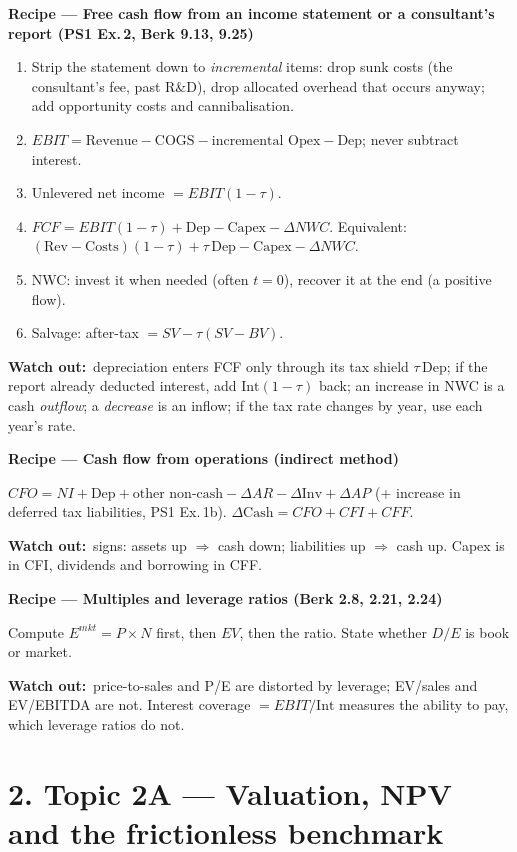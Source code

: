 \documentclass[10pt,a4paper]{article}
\newcommand{\recipe}[1]{\par\smallskip\noindent\textbf{\color{hd}Recipe --- #1}\par}
\newcommand{\watch}{\par\noindent\textbf{\color{wr}Watch out:}~}
\begin{document}
\recipe{Free cash flow from an income statement or a consultant's report (PS1 Ex.\,2, Berk 9.13, 9.25)}
\begin{enumerate}
  \item Strip the statement down to \emph{incremental} items: drop sunk costs (the consultant's fee,
        past R\&D), drop allocated overhead that occurs anyway; add opportunity costs and
        cannibalisation.
  \item $EBIT=\text{Revenue}-\text{COGS}-\text{incremental Opex}-\text{Dep}$; never subtract interest.
  \item Unlevered net income $=EBIT(1-\tau)$.
  \item $FCF=EBIT(1-\tau)+\text{Dep}-\text{Capex}-\Delta NWC$. Equivalent:
        $(\text{Rev}-\text{Costs})(1-\tau)+\tau\,\text{Dep}-\text{Capex}-\Delta NWC$.
  \item NWC: invest it when needed (often $t=0$), recover it at the end (a positive flow).
  \item Salvage: after-tax $=SV-\tau(SV-BV)$.
\end{enumerate}
\watch depreciation enters FCF only through its tax shield $\tau\,\text{Dep}$; if the report already
deducted interest, add $\text{Int}(1-\tau)$ back; an increase in NWC is a cash \emph{outflow}; a
\emph{decrease} is an inflow; if the tax rate changes by year, use each year's rate.

\recipe{Cash flow from operations (indirect method)}
$CFO=NI+\text{Dep}+\text{other non-cash}-\Delta AR-\Delta\text{Inv}+\Delta AP$ (+ increase in deferred
tax liabilities, PS1 Ex.\,1b). $\Delta\text{Cash}=CFO+CFI+CFF$.
\watch signs: assets up $\Rightarrow$ cash down; liabilities up $\Rightarrow$ cash up. Capex is in CFI,
dividends and borrowing in CFF.

\recipe{Multiples and leverage ratios (Berk 2.8, 2.21, 2.24)}
Compute $E^{mkt}=P\times N$ first, then $EV$, then the ratio. State whether $D/E$ is book or market.
\watch price-to-sales and P/E are distorted by leverage; EV/sales and EV/EBITDA are not. Interest
coverage $=EBIT/\text{Int}$ measures the ability to pay, which leverage ratios do not.

\section*{2. Topic 2A --- Valuation, NPV and the frictionless benchmark}
\end{document}
